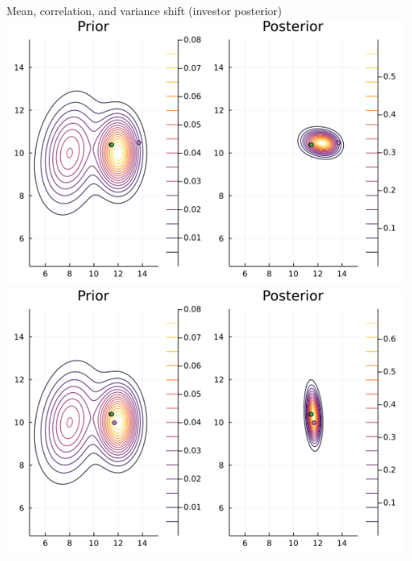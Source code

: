 \documentclass[
  ignorenonframetext,
]{beamer}
\begin{document}
\begin{frame}{Mean, correlation, and variance shift (investor
posterior)}
\protect\hypertarget{mean-correlation-and-variance-shift-investor-posterior}{}
\includegraphics[width=0.4\paperwidth]{complexity_files/figure-beamer/unnamed-chunk-15-1}
\includegraphics[width=0.4\paperwidth]{complexity_files/figure-beamer/unnamed-chunk-15-2}
\end{frame}
\end{document}

